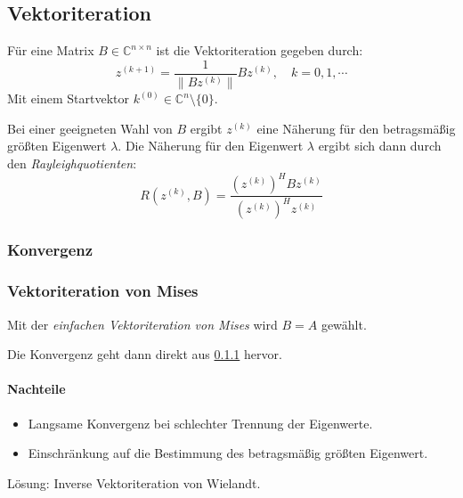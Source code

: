 \documentclass[a4paper, 11pt, accentcolor = tud3b]{tudreport}
\newcommand{\norm}[1]{\ensuremath{\lVert #1 \rVert}}
\newcommand{\C}{\ensuremath{\mathbb{C}}}
\begin{document}
	        \subsection{Vektoriteration}
	            Für eine Matrix \( B \in \C^{n \times n} \) ist die Vektoriteration gegeben durch:
	            \begin{equation*}
		            z^{(k + 1)} = \frac{1}{\norm{Bz^{(k)}}} Bz^{(k)}, \quad k = 0, 1, \cdots
	            \end{equation*}
	            Mit einem Startvektor \( k^{(0)} \in \C^n \setminus \{0\} \).
	            
	            Bei einer geeigneten Wahl von \(B\) ergibt \(z^{(k)}\) eine Näherung für den betragsmäßig größten Eigenwert \(\lambda\). Die Näherung für den Eigenwert \(\lambda\) ergibt sich dann durch den \textit{Rayleighquotienten}:
	            \begin{equation*}
		            R(z^{(k)}, B) = \frac{(z^{(k)})^H B z^{(k)}}{(z^{(k)})^H z^{(k)}}
	            \end{equation*}
	
	            \subsubsection{Konvergenz}
		            \label{sec:eqconvergence}
	            
	
	            \subsubsection{Vektoriteration von Mises}
		            Mit der \textit{einfachen Vektoriteration von Mises} wird \( B = A \) gewählt.
		            
		            Die Konvergenz geht dann direkt aus \ref{sec:eqconvergence} hervor.
		            
		            \paragraph{Nachteile}
			            \begin{itemize}
			            	\item Langsame Konvergenz bei schlechter Trennung der Eigenwerte.
			            	\item Einschränkung auf die Bestimmung des betragsmäßig größten Eigenwert.
			            \end{itemize}
			            Lösung: Inverse Vektoriteration von Wielandt.
	
\end{document}
